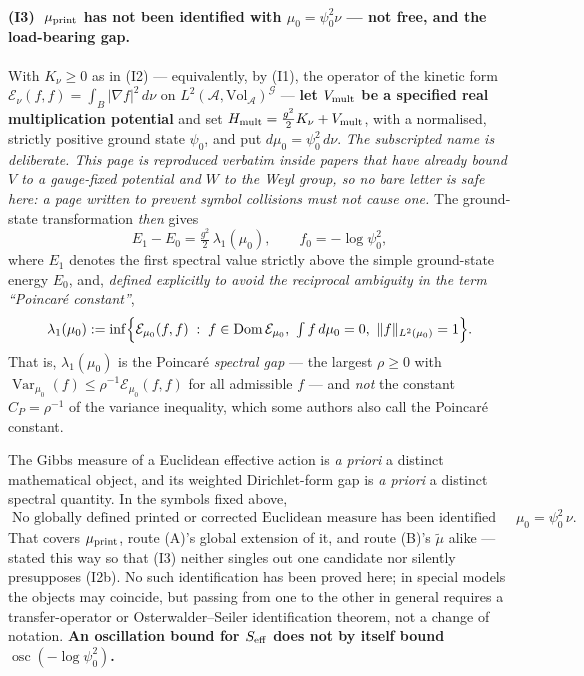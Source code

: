 \documentclass[11pt]{article}
\newcommand{\A}{\mathcal A}
\newcommand{\G}{\mathcal G}
\begin{document}
\paragraph{(I3) $\;\mu_{\rm print}$ has not been identified with $\mu_0=\psi_0^2\nu$
--- not free, and the load-bearing gap.}
With $K_\nu\ge0$ as in (I2) --- equivalently, by (I1), the operator of the kinetic
form $\mathcal E_\nu(f,f)=\int_B|\nabla f|^2\,d\nu$ on
$L^2(\A,\mathrm{Vol}_{\A})^{\G}$ --- \textbf{let $V_{\rm mult}$ be a specified real
multiplication potential} and set
$H_{\rm mult}=\frac{g^2}{2}K_\nu+V_{\rm mult}$, with a normalised, strictly positive
ground state $\psi_0$, and put $d\mu_0=\psi_0^2\,d\nu$. \emph{The subscripted name is
deliberate. This page is reproduced verbatim inside papers that have already bound
$V$ to a gauge-fixed potential and $W$ to the Weyl group, so no bare letter is safe
here: a page written to prevent symbol collisions must not cause one.} The
ground-state transformation \emph{then} gives
\[
E_1-E_0=\tfrac{g^2}{2}\,\lambda_1(\mu_0),\qquad f_0=-\log\psi_0^2 ,
\]
where $E_1$ denotes the first spectral value strictly above the simple ground-state
energy $E_0$, and, \emph{defined explicitly to avoid the reciprocal ambiguity in the
term ``Poincar\'e constant''},
\[
\lambda_1(\mu_0):=\inf\Bigl\{\mathcal E_{\mu_0}(f,f)\;:\;
f\in\operatorname{Dom}\mathcal E_{\mu_0},\ \textstyle\int f\,d\mu_0=0,\
\|f\|_{L^2(\mu_0)}=1\Bigr\}.
\]
That is, $\lambda_1(\mu_0)$ is the Poincar\'e \emph{spectral gap} --- the largest
$\rho\ge0$ with $\operatorname{Var}_{\mu_0}(f)\le\rho^{-1}\mathcal E_{\mu_0}(f,f)$ for
all admissible $f$ --- and \emph{not} the constant $C_P=\rho^{-1}$ of the variance
inequality, which some authors also call the Poincar\'e constant.

The Gibbs measure of a Euclidean effective action is \emph{a priori} a distinct
mathematical object, and its weighted Dirichlet-form gap is \emph{a priori} a distinct
spectral quantity. In the symbols fixed above,
\[
\boxed{\;\text{No globally defined printed or corrected Euclidean measure has been
identified with }\mu_0=\psi_0^2\,\nu.\;}
\]
That covers $\mu_{\rm print}$, route (A)'s global extension of it, and route (B)'s
$\widetilde\mu$ alike --- stated this way so that (I3) neither singles out one
candidate nor silently presupposes (I2b). No such
identification has been proved here; in special models the objects may coincide, but
passing from one to the other in general requires a transfer-operator or
Osterwalder--Seiler identification theorem, not a change of notation. \textbf{An
oscillation bound for $S_{\rm eff}$ does not by itself bound
$\operatorname{osc}(-\log\psi_0^2)$.}
\end{document}

